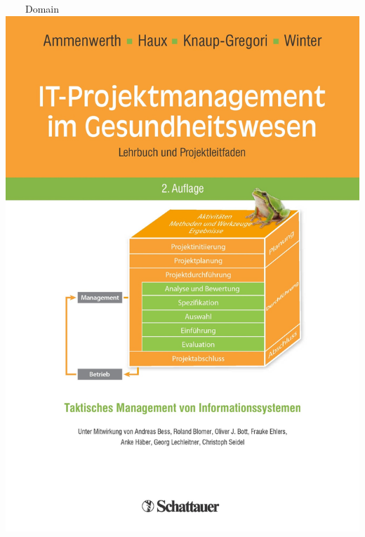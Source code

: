 \documentclass[aspectratio=1610,12pt]{beamer}
\begin{document}
\begin{frame}[plain]{~~~~Domain}
\centering\includegraphics[height=0.77\textheight,keepaspectratio]{img/book-ob.jpg}

\end{frame}
\end{document}
